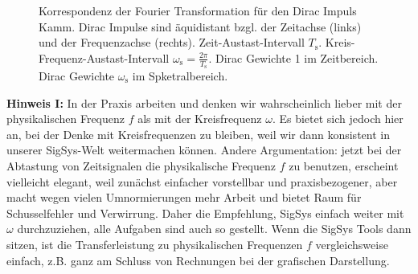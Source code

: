 \begin{figure}[h!]
\centering
%
%
%
%

\caption{Korrespondenz der Fourier Transformation für den Dirac Impuls Kamm.
Dirac Impulse sind äquidistant bzgl. der Zeitachse (links) und
der Frequenzachse (rechts). Zeit-Austast-Intervall $T_\mathrm{s}$.
Kreis-Frequenz-Austast-Intervall $\omega_\textrm{s}=\frac{2\pi}{T_\mathrm{s}}$.
%
Dirac Gewichte 1 im Zeitbereich. Dirac Gewichte $\omega_\text{s}$ im Spketralbereich.}
\label{fig:DiracImpulsKammSkizze}
\end{figure}


\textbf{Hinweis I:} In der Praxis arbeiten und denken wir wahrscheinlich
lieber mit der physikalischen
Frequenz $f$ als mit der Kreisfrequenz $\omega$. Es bietet sich jedoch hier an, bei der Denke
mit Kreisfrequenzen zu bleiben, weil wir dann konsistent in unserer SigSys-Welt
weitermachen können. Andere Argumentation: jetzt bei der Abtastung von Zeitsignalen
die physikalische Frequenz $f$ zu benutzen, erscheint vielleicht elegant,
weil zunächst einfacher vorstellbar und praxisbezogener,
aber macht wegen vielen Umnormierungen mehr Arbeit und bietet Raum für
Schusselfehler und Verwirrung.
Daher die Empfehlung, SigSys einfach weiter mit $\omega$ durchzuziehen,
alle Aufgaben sind auch so gestellt. Wenn die SigSys Tools dann sitzen, ist die
Transferleistung zu physikalischen Frequenzen $f$ vergleichsweise einfach, z.B.
ganz am Schluss von Rechnungen bei der grafischen Darstellung.


